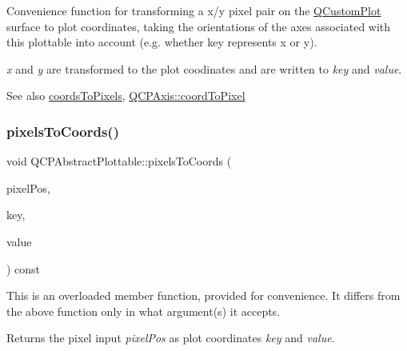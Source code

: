 Convenience function for transforming a x/y pixel pair on the \hyperlink{class_q_custom_plot}{Q\+Custom\+Plot} surface to plot coordinates, taking the orientations of the axes associated with this plottable into account (e.\+g. whether key represents x or y).

{\itshape x} and {\itshape y} are transformed to the plot coodinates and are written to {\itshape key} and {\itshape value}.

\begin{DoxySeeAlso}{See also}
\hyperlink{class_q_c_p_abstract_plottable_a7ad84a36472441cf1f555c5683d0da93}{coords\+To\+Pixels}, \hyperlink{class_q_c_p_axis_af15d1b3a7f7e9b53d759d3ccff1fe4b4}{Q\+C\+P\+Axis\+::coord\+To\+Pixel} 
\end{DoxySeeAlso}
\mbox{\label{class_q_c_p_abstract_plottable_a28d32c0062b9450847851ffdee1c5f69}} 
\subsubsection{\texorpdfstring{pixels\+To\+Coords()}{pixelsToCoords()}\hspace{0.1cm}{\footnotesize\ttfamily [2/2]}}
{\footnotesize\ttfamily void Q\+C\+P\+Abstract\+Plottable\+::pixels\+To\+Coords (\begin{DoxyParamCaption}\item[{const Q\+PointF \&}]{pixel\+Pos,  }\item[{double \&}]{key,  }\item[{double \&}]{value }\end{DoxyParamCaption}) const}

This is an overloaded member function, provided for convenience. It differs from the above function only in what argument(s) it accepts.

Returns the pixel input {\itshape pixel\+Pos} as plot coordinates {\itshape key} and {\itshape value}. \mbox{\label{class_q_c_p_abstract_plottable_a3cc235007e2343a65ad4f463767e0e20}} 
